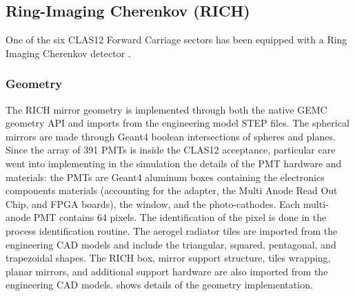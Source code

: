 \subsection{Ring-Imaging Cherenkov (RICH)}

One of the six CLAS12 Forward Carriage sectors has been equipped with a Ring Imaging Cherenkov detector \cite{rich-nim}.

\subsubsection{Geometry}
The RICH mirror geometry is implemented through both the native GEMC geometry API and imports from the engineering
model STEP files. The spherical mirrors are made through Geant4 boolean intersections of spheres and planes.
Since the array of 391 PMTs is inside the CLAS12 acceptance, particular care went into implementing in the
simulation the details of the PMT hardware and materials: the PMTs are Geant4 aluminum boxes containing the
electronics components materials (accounting for the adapter, the  Multi Anode Read Out Chip, and FPGA boards),
the window, and the photo-cathodes.
Each multi-anode PMT contains 64 pixels. The identification of the pixel is done in the process identification routine.
The aerogel radiator tiles are imported from the engineering CAD models and include the triangular, squared, pentagonal,
and trapezoidal shapes. The RICH box, mirror support structure, tiles wrapping, planar mirrors, and additional
support hardware are also imported from the engineering CAD models.
 shows details of the geometry implementation.

